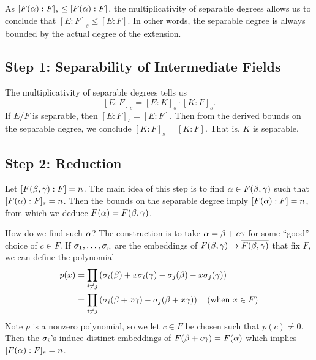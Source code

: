 As $[F(\alpha):F]_s \leq [F(\alpha):F]$, the multiplicativity of separable degrees allows us to conclude that $[E:F]_s \leq [E:F]$. In other words, the separable degree is always bounded by the actual degree of the extension.

\subsection{Step 1: Separability of Intermediate Fields}
The multiplicativity of separable degrees tells us
\[
    [E:F]_s = [E:K]_s \cdot [K:F]_s.
\]
If $E/F$ is separable, then $[E:F]_s = [E:F]$. Then from the derived bounds on the separable degree, we conclude $[K:F]_s = [K:F]$. That is, $K$ is separable.

\subsection{Step 2: Reduction}
Let $[F(\beta,\gamma):F] = n$. The main idea of this step is to find $\alpha \in F(\beta,\gamma)$ such that $[F(\alpha):F]_s = n$. Then the bounds on the separable degree imply $[F(\alpha):F] = n$, from which we deduce $F(\alpha) = F(\beta,\gamma)$.

How do we find such $\alpha$? The construction is to take $\alpha = \beta + c\gamma$ for some ``good'' choice of $c \in F$. If $\sigma_1, \dots, \sigma_n$ are the embeddings of $F(\beta,\gamma) \to \overline{F(\beta,\gamma)}$ that fix $F$, we can define the polynomial
\[
    \begin{split}
        p(x) &= \prod_{i \neq j} \left( \sigma_i(\beta) + x\sigma_i(\gamma) - \sigma_j(\beta) - x\sigma_j(\gamma) \right)\\
             &= \prod_{i \neq j} \left( \sigma_i(\beta + x\gamma) - \sigma_j(\beta + x\gamma) \right) \quad (\text{when } x \in F)\\
    \end{split}
\]
Note $p$ is a nonzero polynomial, so we let $c \in F$ be chosen such that $p(c) \neq 0$. Then the $\sigma_i$'s induce distinct embeddings of $F(\beta + c\gamma) = F(\alpha)$ which implies $[F(\alpha):F]_s = n$.